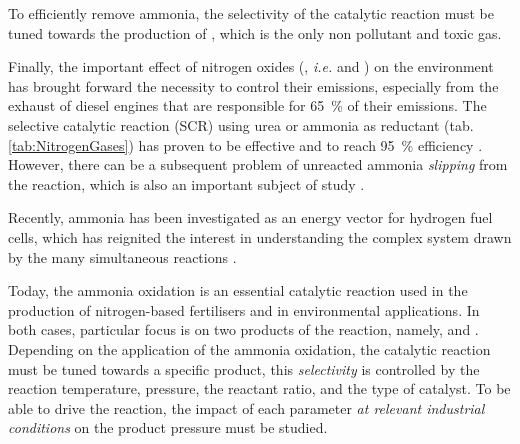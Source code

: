 To efficiently remove ammonia, the selectivity of the catalytic reaction must be tuned towards the production of , which is the only non pollutant and toxic gas.

Finally, the important effect of nitrogen oxides (, \textit{i.e.}  and ) on the environment has brought forward the necessity to control their emissions, especially from the exhaust of diesel engines that are responsible for \qty{65}{\percent} of their emissions.
The selective catalytic reaction (SCR) using urea or ammonia as reductant (tab. \ref{tab:NitrogenGases}) has proven to be effective and to reach \qty{95}{\percent} efficiency \parencite{MitsubishiSCR}.
However, there can be a subsequent problem of unreacted ammonia \textit{slipping} from the reaction, which is also an important subject of study \parencite{Thermofischer}.

Recently, ammonia has been investigated as an energy vector for hydrogen fuel cells, which has reignited the interest in understanding the complex system drawn by the many simultaneous reactions \parencite{Afif2016, Georgina2021}.

Today, the ammonia oxidation is an essential catalytic reaction used in the production of nitrogen-based fertilisers and in environmental applications.
In both cases, particular focus is on two products of the reaction, namely,  and .
Depending on the application of the ammonia oxidation, the catalytic reaction must be tuned towards a specific product, this \textit{selectivity} is controlled by the reaction temperature, pressure, the  reactant ratio, and the type of catalyst.
To be able to drive the reaction, the impact of each parameter \textit{at relevant industrial conditions} on the product pressure must be studied.

